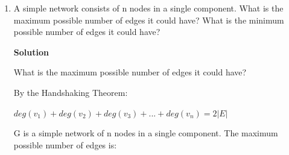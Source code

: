 \documentclass{amsart}
\theoremstyle{definition}
\theoremstyle{remark}
\numberwithin{equation}{section}
\begin{document}
\begin{enumerate}
\vspace{0.5cm}
\textbf{ \larger[3]Solution} 
\vspace{0.5cm}

\begin{enumerate}
    \item The internet, at the level of autonomous systems
    
        Undirected, Acyclic, Approximately planar 
        \vspace{0.5cm}
    \item A food web
        
        Directed, Cyclic 
        \vspace{0.5cm}
    \item The stem and branches of a plant
        
        Tree, Acyclic 
        \vspace{0.5cm}
    \item A spider web
        
        Undirected, Planar 
        \vspace{0.5cm}
    \item A complete clique of four nodes
        
        Undirected, Cyclic 
        \vspace{0.5cm}
\end{enumerate}
\vspace{5cm}
\clearpage
\item A simple network consists of n nodes in a single component. What is the maximum possible number of edges it could have? What is the minimum possible number of edges it could have? 

\vspace{0.5cm}
\textbf{ \larger[3]Solution} 
\vspace{0.5cm}

What is the maximum possible number of edges it could have?

By the Handshaking Theorem:

\vspace{0.2cm}

$deg(v_1)+deg(v_2)+deg(v_3)+...+deg(v_n)=2|E|$

\vspace{0.2cm}

G is a simple network  of n nodes in a single component. The maximum possible number of edges is:


\end{enumerate}
\end{document}

